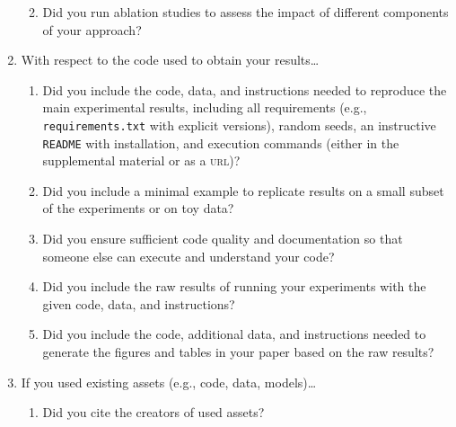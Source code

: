 \documentclass[11pt]{article}
\begin{document}
\begin{enumerate}
\begin{enumerate}
    \answerNA{}
  \item Did you run ablation studies to assess the impact of different
    components of your approach?
    \answerNA{}
  \end{enumerate}
\item With respect to the code used to obtain your results\dots
  \begin{enumerate}
\item Did you include the code, data, and instructions needed to reproduce the
    main experimental results, including all requirements (e.g.,
    \texttt{requirements.txt} with explicit versions), random seeds, an instructive
    \texttt{README} with installation, and execution commands (either in the
    supplemental material or as a \textsc{url})?
  \item Did you include a minimal example to replicate results on a small subset
    of the experiments or on toy data?
  \item Did you ensure sufficient code quality and documentation so that someone else
    can execute and understand your code?
  \item Did you include the raw results of running your experiments with the given
    code, data, and instructions?
  \item Did you include the code, additional data, and instructions needed to generate
    the figures and tables in your paper based on the raw results?
  \end{enumerate}
\item If you used existing assets (e.g., code, data, models)\dots
  \begin{enumerate}
  \item Did you cite the creators of used assets?

\end{enumerate}
\end{enumerate}
\end{document}
